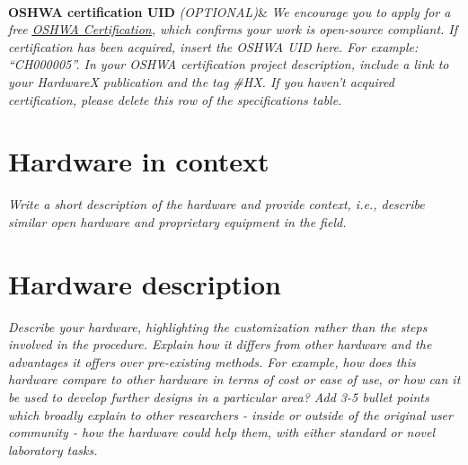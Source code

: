 \documentclass[11pt, letterpaper]{article}
\begin{document}
\begin{flushleft}
\begin{tabu}
  \\
\hline \textbf{OSHWA certification UID} \vskip 0.1cm {\it (OPTIONAL)}&
{\it We encourage you to apply for a free \href{https://certification.oshwa.org/}{\underline{OSHWA Certification}}, which confirms your work is open-source compliant.
\vskip 0.2cm
If certification has been acquired, insert the OSHWA UID here. For example: “CH000005”. In your OSHWA certification project description, include a link to your HardwareX publication and the tag \#HX.
\vskip 0.2cm
If you haven’t acquired certification, please delete this row of the specifications table.}
\\\hline
\end{tabu}
\end{flushleft}
\newpage
\section{Hardware in context}
\textit{Write a short description of the hardware and provide context, i.e., describe similar open hardware and proprietary equipment in the field.}
\section{Hardware description}


\textit{Describe your hardware, highlighting the customization rather than the steps involved in the procedure. Explain how it differs from other hardware and the advantages it offers over pre-existing methods. For example, how does this hardware compare to other hardware in terms of cost or ease of use, or how can it be used to develop further designs in a particular area?
\vskip 0.3cm \noindent
Add 3-5 bullet points which broadly explain to other researchers - inside or outside of the original user community - how the hardware could help them, with either standard or novel laboratory tasks.}
\end{document}
